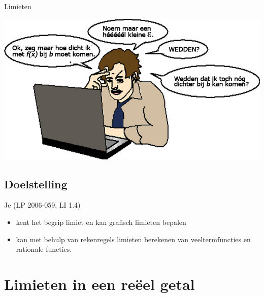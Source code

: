 \documentclass[12pt]{article}
\begin{document}
\pagestyle{fancy}
\lhead{}

\begin{theorie}

\thispagestyle{empty}
\begin{center}
  \begin{mdframed}
    \centering
    \fontsize{50}{60}\selectfont Limieten
  \end{mdframed}
  \vfill
  \includegraphics[width=\textwidth]{limieten}
  \vfill
\end{center}

\subsection*{Doelstelling}
Je \hfill  {\scriptsize(LP 2006-059, LI 1.4)}
\begin{itemize}
\item kent het begrip limiet en kan grafisch limieten bepalen
\item kan met behulp van rekenregels limieten berekenen van veeltermfuncties en rationale functies.
\end{itemize}

\thispagestyle{empty}
\mbox{}
\newpage
\clearpage
\thispagestyle{empty}
\tableofcontents
\newpage
\clearpage
{}

\lhead{}

\onehalfspacing

\end{theorie}

\section{Limieten in een reëel getal}
\end{document}
